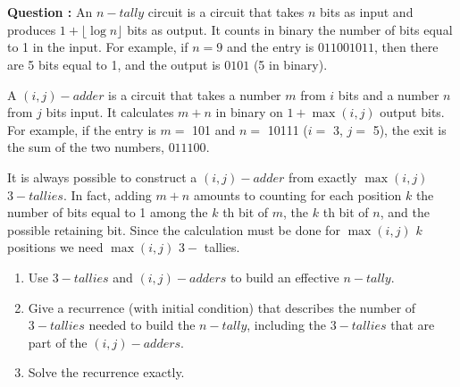 \documentclass[11pt]{article} %
\newenvironment{question}[1][\unskip]{%
	\par
	\noindent
	\textbf{Question #1:}
	\noindent}
{\medskip}
\begin{document}
	
	\section{}
	\begin{question}
		An $ n-tally $ circuit is a circuit that takes $ n $ bits as input and produces $ 1 + \lfloor \log n \rfloor $ bits as output. It counts in binary the number of bits equal to 1 in the input. For example, if $ n = 9 $ and the entry is $ 011001011 $, then there are 5 bits equal to 1, and the output is $ 0101 $ (5 in binary).

		A $ (i, j) -adder $ is a circuit that takes a number $ m $ from $ i $ bits and a number $ n $ from $ j $ bits input. It calculates $ m + n $ in binary on $ 1 + \max (i, j) $ output bits. For example, if the entry is $ m = $ 101 and $ n = $ 10111 ($ i = $ 3, $ j = $ 5), the exit is the sum of the two numbers, $ 011100 $.

		It is always possible to construct a $ (i, j) -adder $ from exactly $ \max (i, j) $ $ 3-tallies $. In fact, adding $ m + n $ amounts to counting for each position $ k $ the number of bits equal to 1 among the $ k $ th bit of $ m $, the $ k $ th bit of $ n $, and the possible retaining bit. Since the calculation must be done for $ \max (i, j) $ $ k $ positions we need $ \max (i, j) $ $ 3-$ tallies.

		\begin{enumerate}
			\item {Use $ 3-tallies $ and $ (i, j) -adders $ to build an effective $ n-tally $.}
			\item{Give a recurrence (with initial condition) that describes the number of $ 3-tallies $ needed to build the $ n-tally $, including the $ 3-tallies $ that are part of the $ (i, j) -adders $.}
			\item{Solve the recurrence exactly.}
		\end{enumerate}
	\end{question}
	
\end{document}
